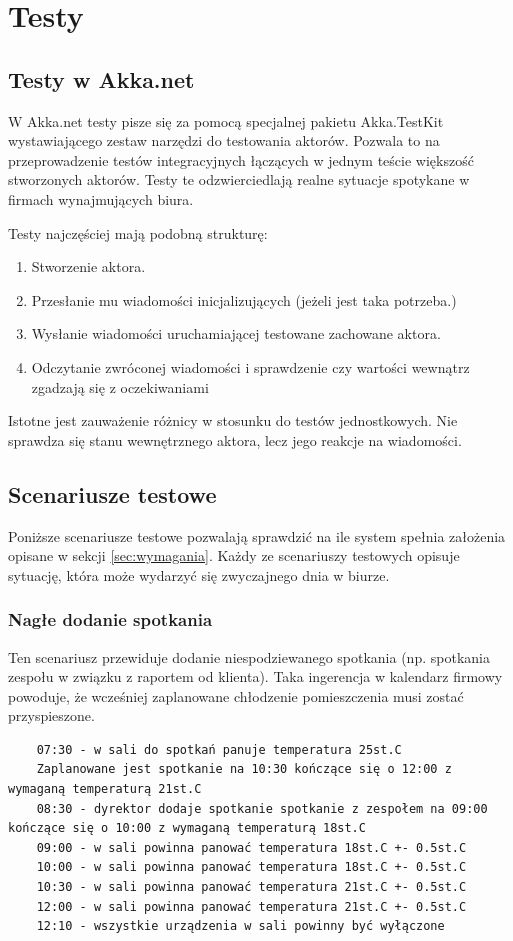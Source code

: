\chapter{Testy}
\section{Testy w Akka.net}
W Akka.net testy pisze się za pomocą specjalnej pakietu Akka.TestKit wystawiającego zestaw narzędzi do testowania aktorów. Pozwala to na 
przeprowadzenie testów integracyjnych łączących w jednym teście większość stworzonych aktorów. Testy te odzwierciedlają realne sytuacje spotykane w firmach wynajmujących biura. 

Testy najczęściej mają podobną strukturę:
\begin{enumerate}
    \item Stworzenie aktora.
    \item Przesłanie mu wiadomości inicjalizujących (jeżeli jest taka potrzeba.)
    \item Wysłanie wiadomości uruchamiającej testowane zachowane aktora.
    \item Odczytanie zwróconej wiadomości i sprawdzenie czy wartości wewnątrz zgadzają się z oczekiwaniami
\end{enumerate}
Istotne jest zauważenie różnicy w stosunku do testów jednostkowych. Nie sprawdza się stanu wewnętrznego aktora, lecz jego reakcje na wiadomości.

\section{Scenariusze testowe}
Poniższe scenariusze testowe pozwalają sprawdzić na ile system spełnia założenia opisane w sekcji \ref{sec:wymagania}. Każdy ze scenariuszy testowych opisuje sytuację, która może wydarzyć się zwyczajnego dnia w biurze.

\subsection{Nagłe dodanie spotkania}
Ten scenariusz przewiduje dodanie niespodziewanego spotkania (np. spotkania zespołu w związku z raportem od klienta). Taka ingerencja w kalendarz firmowy powoduje, że wcześniej zaplanowane chłodzenie pomieszczenia musi zostać przyspieszone. 

\begin{lstlisting}
    07:30 - w sali do spotkań panuje temperatura 25st.C
    Zaplanowane jest spotkanie na 10:30 kończące się o 12:00 z wymaganą temperaturą 21st.C
    08:30 - dyrektor dodaje spotkanie spotkanie z zespołem na 09:00 kończące się o 10:00 z wymaganą temperaturą 18st.C
    09:00 - w sali powinna panować temperatura 18st.C +- 0.5st.C
    10:00 - w sali powinna panować temperatura 18st.C +- 0.5st.C
    10:30 - w sali powinna panować temperatura 21st.C +- 0.5st.C
    12:00 - w sali powinna panować temperatura 21st.C +- 0.5st.C
    12:10 - wszystkie urządzenia w sali powinny być wyłączone
\end{lstlisting}

